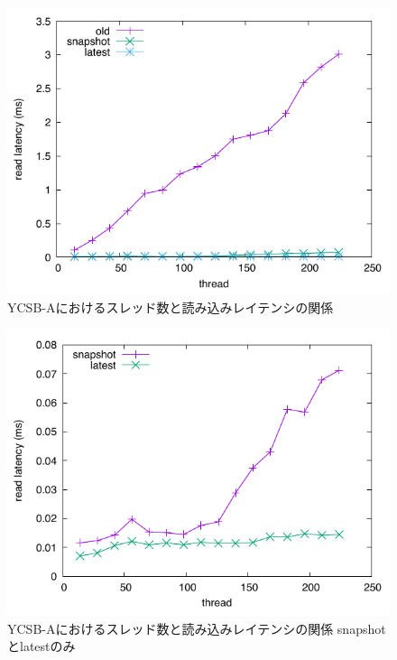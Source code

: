 \documentclass[a4paper]{jreport}	%
\begin{document}
\begin{figure}[h] 
\centering
\includegraphics[width=15cm]{ycsb-a/opposite-read-latency}
\caption{YCSB-Aにおけるスレッド数と読み込みレイテンシの関係}
\label{fig:a-read-latency}
\end{figure}

\begin{figure}[h] 
\centering
\includegraphics[width=15cm]{ycsb-a/opposite-read-latency2}
\caption{YCSB-Aにおけるスレッド数と読み込みレイテンシの関係 snapshotとlatestのみ}
\label{fig:a-read-latency2}
\end{figure}
\end{document}
